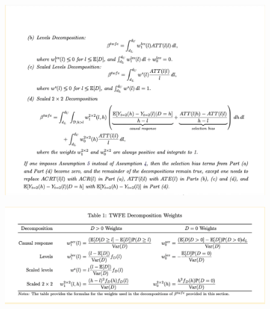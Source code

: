 \documentclass{beamer}
\begin{document}
\begin{frame}

\begin{figure}
\begin{center}
             \includegraphics[scale=0.5]{./lecture_includes/continuous10.png}
\end{center}
\end{figure}

\end{frame}
\begin{frame}

\begin{figure}
\begin{center}
             \includegraphics[scale=0.5]{./lecture_includes/continuous11.png}
\end{center}
\end{figure}

\end{frame}
\end{document}
